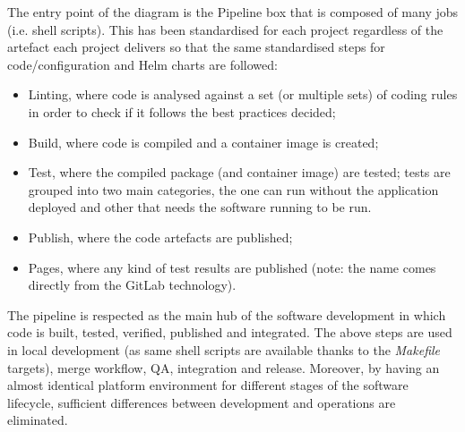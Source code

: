\documentclass[a4paper,
               keeplastbox,   %
               ]{jacow}
\begin{document}
The entry point of the diagram is the Pipeline box that is composed of many jobs (i.e. shell scripts).  This has been standardised for each project regardless of the artefact each project delivers so that the same standardised steps for code/configuration and Helm charts are followed:
\begin{itemize}
    \item Linting, where code is analysed against a set (or multiple sets) of coding rules in order to check if it follows the best practices decided;
    \item Build, where code is compiled and a container image is created;
    \item Test, where the compiled package (and container image) are tested; tests are grouped into two main categories, the one can run without the application deployed and other that needs the software running to be run.
    \item Publish, where the code artefacts are published;
    \item Pages, where any kind of test results are published (note: the name comes directly from the GitLab technology).
\end{itemize}

The pipeline is respected as the main hub of the software development in which code is built, tested, verified, published and integrated. The above steps are used in local development (as same shell scripts are available thanks to the \textit{Makefile} targets), merge workflow, QA, integration and release. Moreover, by having an almost identical platform environment for different stages of the software lifecycle, sufficient differences between development and operations are eliminated.
\end{document}
